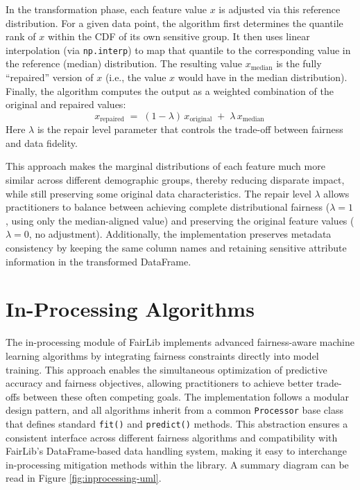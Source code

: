 \documentclass[12pt,a4paper,openright,twoside]{book}
\begin{document}
In the transformation phase, each feature value $x$ is adjusted via this reference distribution. For a given data point, the algorithm first determines the quantile rank of $x$ within the CDF of its own sensitive group. It then uses linear interpolation (via \texttt{np.interp}) to map that quantile to the corresponding value in the reference (median) distribution. The resulting value $x_{\text{median}}$ is the fully “repaired” version of $x$ (i.e., the value $x$ would have in the median distribution). Finally, the algorithm computes the output as a weighted combination of the original and repaired values: 
\[ 
x_{\text{repaired}} \;=\; (1 - \lambda)\,x_{\text{original}} \;+\; \lambda\,x_{\text{median}}\,
\] 
Here $\lambda$ is the repair level parameter that controls the trade-off between fairness and data fidelity.

This approach makes the marginal distributions of each feature much more similar across different demographic groups, thereby reducing disparate impact, while still preserving some original data characteristics. The repair level $\lambda$ allows practitioners to balance between achieving complete distributional fairness ($\lambda = 1$, using only the median-aligned value) and preserving the original feature values ($\lambda = 0$, no adjustment). Additionally, the implementation preserves metadata consistency by keeping the same column names and retaining sensitive attribute information in the transformed DataFrame.

\section{In-Processing Algorithms}
The in-processing module of FairLib implements advanced fairness-aware machine learning algorithms by integrating fairness constraints directly into model training. This approach enables the simultaneous optimization of predictive accuracy and fairness objectives, allowing practitioners to achieve better trade-offs between these often competing goals. The implementation follows a modular design pattern, and all algorithms inherit from a common \texttt{Processor} base class that defines standard \texttt{fit()} and \texttt{predict()} methods. This abstraction ensures a consistent interface across different fairness algorithms and compatibility with FairLib’s DataFrame-based data handling system, making it easy to interchange in-processing mitigation methods within the library. A summary diagram can be read in Figure \ref{fig:inprocessing-uml}.
\end{document}
